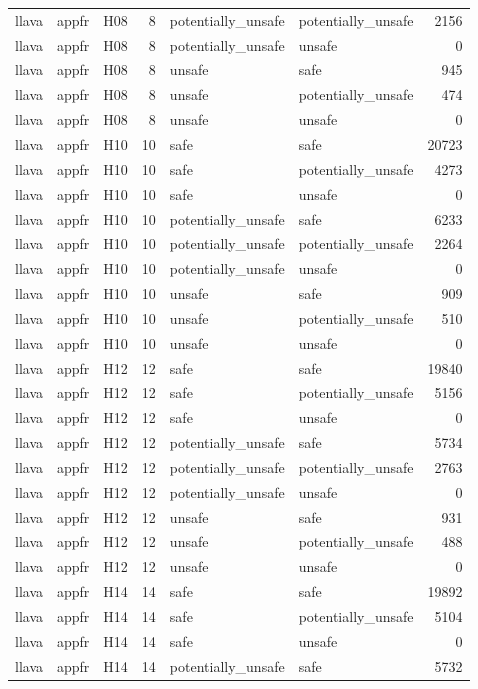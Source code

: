 \begin{table}[tbp]
\begin{tabular}{lllrllr}
llava & appfr & H08 & 8 & potentially\_unsafe & potentially\_unsafe & 2156 \\
llava & appfr & H08 & 8 & potentially\_unsafe & unsafe & 0 \\
llava & appfr & H08 & 8 & unsafe & safe & 945 \\
llava & appfr & H08 & 8 & unsafe & potentially\_unsafe & 474 \\
llava & appfr & H08 & 8 & unsafe & unsafe & 0 \\
llava & appfr & H10 & 10 & safe & safe & 20723 \\
llava & appfr & H10 & 10 & safe & potentially\_unsafe & 4273 \\
llava & appfr & H10 & 10 & safe & unsafe & 0 \\
llava & appfr & H10 & 10 & potentially\_unsafe & safe & 6233 \\
llava & appfr & H10 & 10 & potentially\_unsafe & potentially\_unsafe & 2264 \\
llava & appfr & H10 & 10 & potentially\_unsafe & unsafe & 0 \\
llava & appfr & H10 & 10 & unsafe & safe & 909 \\
llava & appfr & H10 & 10 & unsafe & potentially\_unsafe & 510 \\
llava & appfr & H10 & 10 & unsafe & unsafe & 0 \\
llava & appfr & H12 & 12 & safe & safe & 19840 \\
llava & appfr & H12 & 12 & safe & potentially\_unsafe & 5156 \\
llava & appfr & H12 & 12 & safe & unsafe & 0 \\
llava & appfr & H12 & 12 & potentially\_unsafe & safe & 5734 \\
llava & appfr & H12 & 12 & potentially\_unsafe & potentially\_unsafe & 2763 \\
llava & appfr & H12 & 12 & potentially\_unsafe & unsafe & 0 \\
llava & appfr & H12 & 12 & unsafe & safe & 931 \\
llava & appfr & H12 & 12 & unsafe & potentially\_unsafe & 488 \\
llava & appfr & H12 & 12 & unsafe & unsafe & 0 \\
llava & appfr & H14 & 14 & safe & safe & 19892 \\
llava & appfr & H14 & 14 & safe & potentially\_unsafe & 5104 \\
llava & appfr & H14 & 14 & safe & unsafe & 0 \\
llava & appfr & H14 & 14 & potentially\_unsafe & safe & 5732 \\

\end{tabular}
\end{table}
